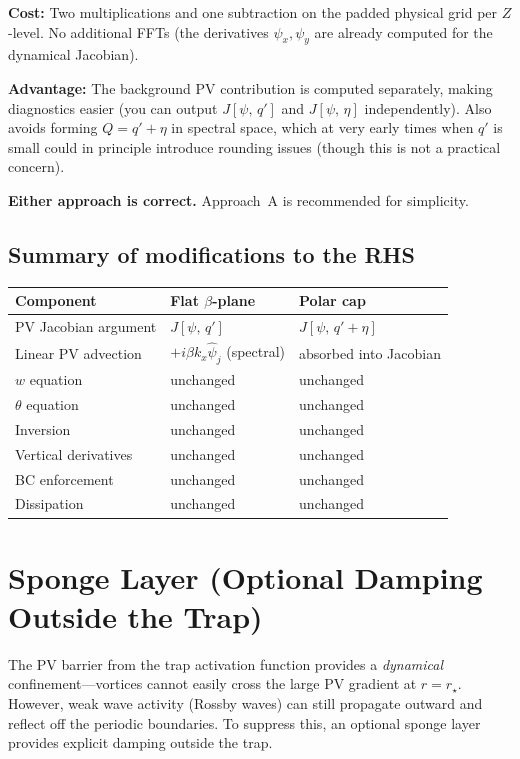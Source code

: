 \documentclass[11pt]{article}
\newcommand{\Jac}[2]{J\!\left[#1,\,#2\right]}
\newcommand{\hhat}[1]{\widehat{#1}}
\begin{document}
\textbf{Cost:} Two multiplications and one subtraction on the padded physical grid per $Z$-level. No additional FFTs (the derivatives $\psi_x, \psi_y$ are already computed for the dynamical Jacobian).

\textbf{Advantage:} The background PV contribution is computed separately, making diagnostics easier (you can output $\Jac{\psi}{q'}$ and $\Jac{\psi}{\eta}$ independently). Also avoids forming $Q = q' + \eta$ in spectral space, which at very early times when $q'$ is small could in principle introduce rounding issues (though this is not a practical concern).

\textbf{Either approach is correct.} Approach~A is recommended for simplicity.

\subsection{Summary of modifications to the RHS}

\begin{center}
\begin{tabular}{lll}
\toprule
Component & Flat $\beta$-plane & Polar cap \\
\midrule
PV Jacobian argument & $\Jac{\psi}{q'}$ & $\Jac{\psi}{q' + \eta}$ \\
Linear PV advection & $+i\beta k_x \hhat\psi_j$ (spectral) & absorbed into Jacobian \\
$w$ equation & unchanged & unchanged \\
$\theta$ equation & unchanged & unchanged \\
Inversion & unchanged & unchanged \\
Vertical derivatives & unchanged & unchanged \\
BC enforcement & unchanged & unchanged \\
Dissipation & unchanged & unchanged \\
\bottomrule
\end{tabular}
\end{center}

\section{Sponge Layer (Optional Damping Outside the Trap)}
\label{sec:sponge}

The PV barrier from the trap activation function provides a \emph{dynamical} confinement---vortices cannot easily cross the large PV gradient at $r = r_\star$. However, weak wave activity (Rossby waves) can still propagate outward and reflect off the periodic boundaries. To suppress this, an optional sponge layer provides explicit damping outside the trap.
\end{document}
